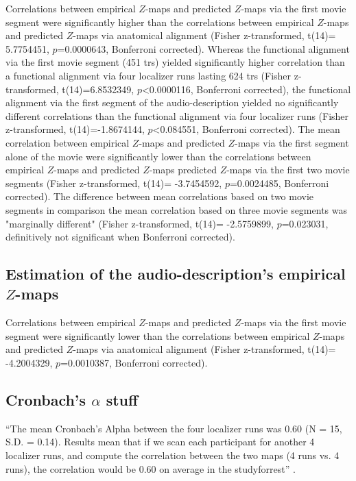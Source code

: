 %
Correlations between empirical $Z$-maps and predicted $Z$-maps via the first
movie segment were significantly higher than the correlations between empirical
$Z$-maps and predicted $Z$-maps via anatomical alignment (Fisher z-transformed,
t(14)= 5.7754451, $p$=0.0000643, Bonferroni corrected).
%
Whereas the functional alignment via the first movie segment (451 \acp{tr})
yielded significantly higher correlation than a functional alignment via four
localizer runs lasting 624 \acp{tr} (Fisher z-transformed, t(14)=6.8532349,
$p$<0.0000116, Bonferroni corrected),
%
the functional alignment via the first segment of the audio-description yielded
no significantly different correlations than the functional alignment via four
localizer runs (Fisher z-transformed, t(14)=-1.8674144, $p$<0.084551, Bonferroni
corrected).
%
The mean correlation between empirical $Z$-maps and predicted $Z$-maps via the
first segment alone of the movie were significantly lower than the correlations
between empirical $Z$-maps and predicted $Z$-maps predicted $Z$-maps via the
first two movie segments (Fisher z-transformed, t(14)= -3.7454592,
$p$=0.0024485, Bonferroni corrected).
%
The difference between mean correlations based on two movie segments in
comparison the mean correlation based on three movie segments was "marginally
different" (Fisher z-transformed, t(14)= -2.5759899, $p$=0.023031, definitively
not significant when Bonferroni corrected).


\subsection{Estimation of the audio-description's empirical $Z$-maps}


%
Correlations between empirical $Z$-maps and predicted $Z$-maps via the first
movie segment were significantly lower than the correlations between empirical
$Z$-maps and predicted $Z$-maps via anatomical alignment (Fisher z-transformed,
t(14)= -4.2004329, $p$=0.0010387, Bonferroni corrected).


\subsection{Cronbach's $\alpha$ stuff}

``The mean Cronbach's Alpha between the four localizer runs was 0.60 (N = 15,
S.D.  = 0.14).
%
Results mean that if we scan each participant for another 4 localizer runs, and
compute the correlation between the two maps (4 runs vs. 4 runs), the
correlation would be 0.60 on average in the studyforrest''
\citep{jiahui2020predicting}.



